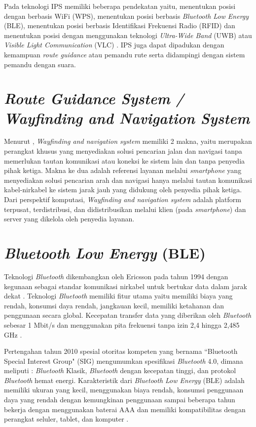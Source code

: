 \par Pada teknologi IPS memiliki beberapa pendekatan yaitu, menentukan posisi dengan berbasis WiFi (WPS), menentukan posisi berbasis \textit{Bluetooth Low Energy} (BLE), menentukan posisi berbasis Identifikasi Frekuensi Radio (RFID) dan menentukan posisi dengan menggunakan teknologi \textit{Ultra-Wide Band} (UWB) atau \textit{Visible Light Communication} (VLC) \citep{canton2017bluetooth}. IPS juga dapat dipadukan dengan kemampuan \textit{route guidance} atau pemandu rute serta didampingi dengan sistem pemandu dengan suara.


\section{\textit{Route Guidance System / Wayfinding and Navigation System}}
Menurut \citep{karimi2015indoor}, \textit{Wayfinding and navigation system} memiliki 2 makna, yaitu merupakan perangkat khusus yang menyediakan solusi pencarian jalan dan navigasi tanpa memerlukan tautan komunikasi atau koneksi ke sistem lain dan tanpa penyedia pihak ketiga. Makna ke dua adalah referensi layanan melalui \textit{smartphone} yang menyediakan solusi pencarian arah dan navigasi hanya melalui tautan komunikasi kabel-nirkabel ke sistem jarak jauh yang didukung oleh penyedia pihak ketiga. Dari perspektif komputasi, \textit{Wayfinding and navigation system} adalah platform terpusat, terdistribusi, dan didistribusikan melalui klien (pada \textit{smartphone}) dan server yang dikelola oleh penyedia layanan.

\section{\textit{Bluetooth Low Energy} (BLE)}
Teknologi \textit{Bluetooth} dikembangkan oleh Ericsson pada tahun 1994 dengan kegunaan sebagai standar komunikasi nirkabel untuk bertukar data dalam jarak dekat \citep{kaluvza2017analysis}. Teknologi \textit{Bluetooth} memiliki fitur utama yaitu memiliki biaya yang rendah, konsumsi daya rendah, jangkauan kecil, memiliki ketahanan dan penggunaan secara global. Kecepatan transfer data yang diberikan oleh \textit{Bluetooth} sebesar 1 Mbit/s dan menggunakan pita frekuensi tanpa izin 2,4 hingga 2,485 GHz \citep{kaluvza2017analysis}.

\par Pertengahan tahun 2010 spesial otoritas kompeten yang bernama “Bluetooth Special Interest Group" (SIG) mengumumkan spesifikasi \textit{Bluetooth} 4.0, dimana meliputi : \textit{Bluetooth} Klasik, \textit{Bluetooth} dengan kecepatan tinggi, dan protokol \textit{Bluetooth} hemat energi. Karakteristik dari \textit{Bluetooth Low Energy} (BLE) adalah memiliki ukuran yang kecil, menggunakan biaya rendah, konsumsi penggunaan daya yang rendah dengan kemungkinan penggunaan sampai beberapa tahun bekerja dengan menggunakan baterai AAA dan memiliki kompatibilitas dengan perangkat seluler, tablet, dan komputer \citep{kaluvza2017analysis}.

